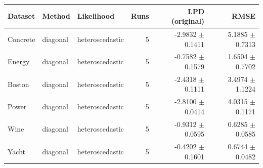 \begin{tabular}{lllrrr}
\toprule
Dataset & Method & Likelihood & Runs & LPD (original) & RMSE \\
\midrule
Concrete & diagonal & heteroscedastic & 5 & -2.9832 $\pm$ 0.1411 & 5.1885 $\pm$ 0.7313 \\
Energy & diagonal & heteroscedastic & 5 & -0.7582 $\pm$ 0.1579 & 1.6504 $\pm$ 0.7702 \\
Boston & diagonal & heteroscedastic & 5 & -2.4318 $\pm$ 0.1111 & 3.4974 $\pm$ 1.1224 \\
Power & diagonal & heteroscedastic & 5 & -2.8100 $\pm$ 0.0414 & 4.0315 $\pm$ 0.1171 \\
Wine & diagonal & heteroscedastic & 5 & -0.9312 $\pm$ 0.0595 & 0.6285 $\pm$ 0.0585 \\
Yacht & diagonal & heteroscedastic & 5 & -0.4202 $\pm$ 0.1601 & 0.6744 $\pm$ 0.0482 \\
\bottomrule
\end{tabular}
